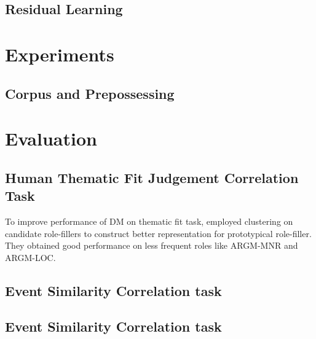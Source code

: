 \documentclass[a4paper]{article}
\begin{document}
\subsection{Residual Learning} \label{sec:residual}


\newpage

\section{Experiments}  \label{sec:exp}
\subsection{Corpus and Prepossessing} \label{sec:corpus}







\section{Evaluation}  \label{sec:evaluation}
\subsection{Human Thematic Fit Judgement Correlation Task}  \label{sec:thematicfit}
To improve performance of DM on thematic fit task, \citet{greenberg2015improving} employed clustering on candidate role-fillers to construct better representation for prototypical role-filler. They obtained good performance on less frequent roles like ARGM-MNR and ARGM-LOC. 

\subsection{Event Similarity Correlation task}  \label{sec:wordsim}


\subsection{Event Similarity Correlation task}  \label{sec:eventsim}
\end{document}
